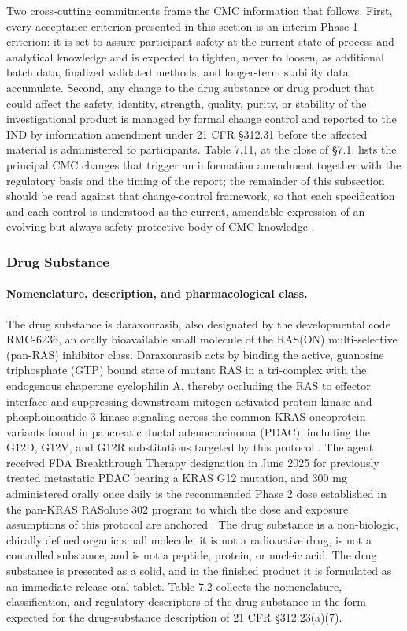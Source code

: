 Two cross-cutting commitments frame the CMC information that follows. First, every
acceptance criterion presented in this section is an interim Phase 1 criterion: it
is set to assure participant safety at the current state of process and analytical
knowledge and is expected to tighten, never to loosen, as additional batch data,
finalized validated methods, and longer-term stability data accumulate. Second,
any change to the drug substance or drug product that could affect the safety,
identity, strength, quality, purity, or stability of the investigational product
is managed by formal change control and reported to the IND by information
amendment under 21 CFR \S 312.31 before the affected material is administered to
participants. Table 7.11, at the close of \S 7.1, lists the principal CMC changes
that trigger an information amendment together with the regulatory basis and the
timing of the report; the remainder of this subsection should be read against
that change-control framework, so that each specification and each control is
understood as the current, amendable expression of an evolving but always
safety-protective body of CMC knowledge \cite{phase1guidance}.

\subsubsection{Drug Substance}

\paragraph{Nomenclature, description, and pharmacological class.}
The drug substance is daraxonrasib, also designated by the developmental code
RMC-6236, an orally bioavailable small molecule of the RAS(ON)
multi-selective (pan-RAS) inhibitor class. Daraxonrasib acts by binding the
active, guanosine triphosphate (GTP) bound state of mutant RAS in a tri-complex
with the endogenous chaperone cyclophilin A, thereby occluding the
RAS to effector interface and suppressing downstream mitogen-activated protein
kinase and phosphoinositide 3-kinase signaling across the common KRAS
oncoprotein variants found in pancreatic ductal adenocarcinoma (PDAC), including
the G12D, G12V, and G12R substitutions targeted by this protocol
\cite{daraxwhipple,pdac060s2030}. The agent received FDA Breakthrough Therapy
designation in June 2025 for previously treated metastatic PDAC bearing a KRAS
G12 mutation, and 300 mg administered orally once daily is the recommended
Phase 2 dose established in the pan-KRAS RASolute 302 program to which the dose
and exposure assumptions of this protocol are anchored
\cite{daraxwhipple,pdac060s2030}. The drug substance is a non-biologic, chirally
defined organic small molecule; it is not a radioactive drug, is not a
controlled substance, and is not a peptide, protein, or nucleic acid. The drug
substance is presented as a solid, and in the finished product it is formulated
as an immediate-release oral tablet. Table 7.2 collects the nomenclature,
classification, and regulatory descriptors of the drug substance in the form
expected for the drug-substance description of 21 CFR \S 312.23(a)(7).


